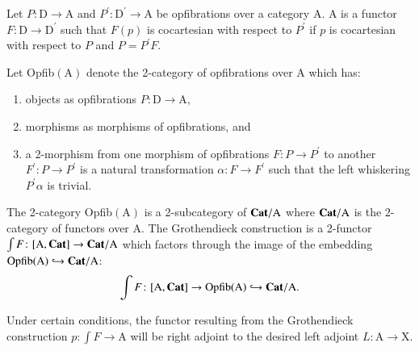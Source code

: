 \documentclass{amsart}
\begin{document}
\begin{defn}
Let $P \colon \mathrm{D} \to \mathrm{A}$ and $P^\prime \colon \mathrm{D^\prime} \to \mathrm{A}$ be opfibrations over a category $\mathrm{A}$. A  is a functor $F \colon \mathrm{D} \to \mathrm{D}^\prime$ such that $F(p)$ is cocartesian with respect to $P^\prime$ if $p$ is cocartesian with respect to $P$ and $P=P^\prime F$.
\end{defn}

Let Opfib$(\mathrm{A})$ denote the 2-category of opfibrations over $\mathrm{A}$ which has:
\begin{enumerate}
\item{objects as opfibrations $P \colon \mathrm{D} \to \mathrm{A}$,}
\item{morphisms as morphisms of opfibrations, and}
\item{a 2-morphism from one morphism of opfibrations $F \colon P \to P^\prime$ to another $F^\prime \colon P \to P^\prime$ is a natural transformation $\alpha \colon F \to F^\prime$ such that the left whiskering $P^\prime \alpha$ is trivial.}
\end{enumerate}

The 2-category Opfib$(\mathrm{A})$ is a 2-subcategory of $\bold{Cat}/ \mathrm{A}$ where $\bold{Cat} / \mathrm{A}$ is the 2-category of functors over $\mathrm{A}$. The Grothendieck construction is a 2-functor $\int F \colon [ \mathrm{A},\bold{Cat}] \to \bold{Cat}/ \mathrm{A}$ which factors through the image of the embedding $\textnormal{Opfib}(\mathrm{A}) \hookrightarrow \bold{Cat} / \mathrm{A}$: $$\int F \colon [ \mathrm{A}, \bold{Cat} ] \to \textnormal{Opfib}(\mathrm{A}) \hookrightarrow \bold{Cat} / \mathrm{A}.$$

Under certain conditions, the functor resulting from the Grothendieck construction $p \colon \int{F} \to \mathrm{A}$ will be right adjoint to the desired left adjoint $L \colon \mathrm{A} \to \mathrm{X}$.
\end{document}
